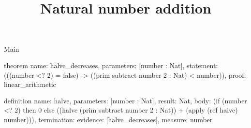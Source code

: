 \begin{lexlean}{Main}
\title{Natural number addition}
\begin{semanticmodule}
theorem{
  name: halve_decreases,
  parameters: [number : Nat],
  statement: (((number <? 2) = false) -> ((prim subtract number 2 : Nat) < number)),
  proof: linear_arithmetic{}
}

definition{
  name: halve,
  parameters: [number : Nat],
  result: Nat,
  body: (if (number <? 2) then 0 else ((halve (prim subtract number 2 : Nat)) + (apply (ref halve) number))),
  termination: {evidence: [halve_decreases], measure: number}
}
\end{semanticmodule}
\end{lexlean}

